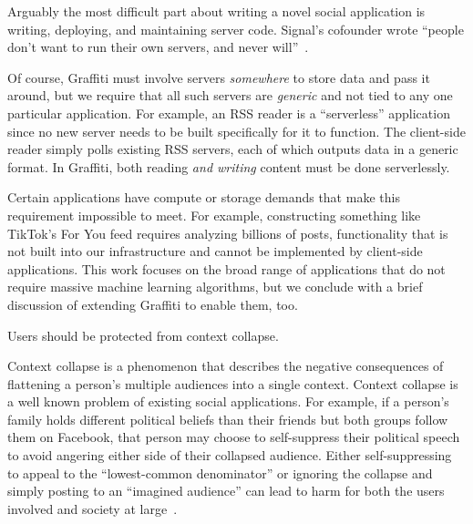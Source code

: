 Arguably the most difficult part about writing a novel
social application is writing, deploying,
and maintaining server code.
Signal's cofounder wrote
``people don’t want to run their own servers, and never will''~\cite{moxieweb3}.

Of course, Graffiti must involve servers \emph{somewhere} to store data
and pass it around, but we require that all such servers are \emph{generic}
and not tied to any one particular application.
For example, an RSS reader is a ``serverless'' application since
no new server needs to be built specifically for it to function.
The client-side reader simply polls existing RSS servers, each of which outputs data in a generic format.
In Graffiti, both reading \emph{and writing} content must be done serverlessly.

Certain applications have compute or storage demands that make this requirement impossible to meet.
For example, constructing something like TikTok's For You feed requires
analyzing billions of posts, functionality that is not built into our infrastructure and cannot be implemented by client-side applications.
This work focuses on the broad range of applications
that do not require massive machine learning algorithms,
but we conclude with a brief discussion of extending Graffiti to enable them, too.


\begin{requirement}
\label{requirements:context-differentiation}
    Users should be protected from context collapse.
\end{requirement}

Context collapse is a phenomenon that describes the negative consequences of flattening
a person's multiple audiences into a single context.
Context collapse is a well known problem of existing social applications.
For example, if a person's family holds different political beliefs than their friends
but both groups follow them on Facebook, that person may choose to self-suppress their political
speech to avoid angering either side of their collapsed audience.
Either self-suppressing to appeal to the ``lowest-common denominator'' or ignoring the collapse
and simply posting to an ``imagined audience'' can lead to harm for both
the users involved and society at large~\cite{contextcollapse, contextcollapseimpact, contextcollapsequeer, spiralofsilencesocialmedia}.


